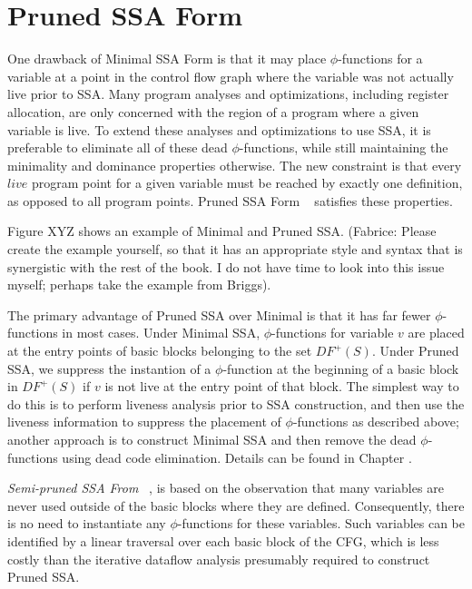 \section{Pruned SSA Form}

One drawback of Minimal SSA Form is that it may place $\phi$-functions
for a variable at a point in the control flow graph where the variable was
not actually live prior to SSA. Many program analyses and optimizations,
including register allocation, are only concerned with the region of a 
program where a given variable is live. To extend these analyses and
optimizations to use SSA, it is preferable to eliminate all
of these dead $\phi$-functions, while still maintaining the minimality
and dominance properties otherwise. The new constraint is that every
$live$ program point for a given variable must be reached by exactly one
definition, as opposed to all program points.  Pruned SSA Form
~\cite{ChoiJan91} satisfies these properties. 

Figure XYZ shows an example of Minimal and Pruned SSA. 
(Fabrice: Please create the example yourself, so that it has an appropriate
style and syntax that is synergistic with the rest of the book. I do not have
time to look into this issue myself; perhaps take the example from Briggs). 

The primary advantage of Pruned SSA over Minimal is that it has far
fewer $\phi$-functions in most cases. 
Under Minimal SSA, $\phi$-functions for variable $v$ are placed at
the entry points of basic blocks belonging to the set $DF^{+}(S)$. 
Under Pruned SSA, we suppress the instantion of a $\phi$-function
at the beginning of a basic block in $DF^{+}(S)$ if $v$ is not live
at the entry point of that block. The simplest way to do this is to
perform liveness analysis prior to SSA construction, and then
use the liveness information to suppress the placement of $\phi$-functions
as described above; another approach is to construct Minimal SSA
and then remove the dead $\phi$-functions using dead code
elimination. Details can be found in Chapter 
\label{chap:classical_construction}.



\emph{Semi-pruned SSA From} ~\cite{BriggsJul98}, 
is based on the observation that
many variables are never used outside of the basic blocks
where they are defined. Consequently, there is no need 
to instantiate any $\phi$-functions for these variables.
Such variables can be identified by a linear traversal
over each basic block of the CFG, which is less costly
than the iterative dataflow analysis presumably required
to construct Pruned SSA. 
 
